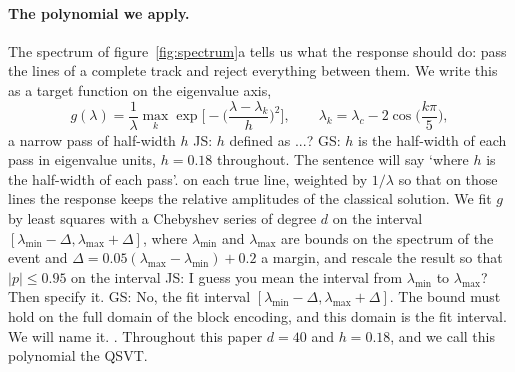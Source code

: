 \documentclass[11pt,a4paper]{article}
\newcommand{\js}[1]{{\color{blue} JS: #1 }}
\newcommand{\gs}[1]{{\color{orange!85!black} GS: #1 }}
\begin{document}
\paragraph{The polynomial we apply.}
The spectrum of figure~\ref{fig:spectrum}a tells us what the response should do: pass the lines of a
complete track and reject everything between them. We write this as a target function on the
eigenvalue axis,
\begin{equation}
g(\lambda)=\frac{1}{\lambda}\max_{k}\exp\!\Big[-\Big(\frac{\lambda-\lambda_k}{h}\Big)^2\Big],\qquad
\lambda_k=\lambda_c-2\cos\!\Big(\frac{k\pi}{5}\Big),
\end{equation}
a narrow pass of half-width $h$ \js{$h$ defined as ...?} \gs{$h$ is the half-width of each pass in eigenvalue units, $h=0.18$ throughout. The sentence will say `where $h$ is the half-width of each pass'.} on each true line, weighted by $1/\lambda$ so that on those lines
the response keeps the relative amplitudes of the classical solution. We fit $g$ by least squares
with a Chebyshev series of degree $d$ on the interval $[\lambda_{\min}-\Delta,\lambda_{\max}+\Delta]$,
where $\lambda_{\min}$ and $\lambda_{\max}$ are bounds on the spectrum of the event and
$\Delta=0.05(\lambda_{\max}-\lambda_{\min})+0.2$ a margin, and rescale the result so that
$|p|\le0.95$ on the interval \js{I guess you mean the interval from $\lambda_{\min}$ to $\lambda_{\max}$? Then specify it. } \gs{No, the fit interval $[\lambda_{\min}-\Delta,\lambda_{\max}+\Delta]$. The bound must hold on the full domain of the block encoding, and this domain is the fit interval. We will name it.}. Throughout this paper $d=40$ and $h=0.18$, and we call this
polynomial the QSVT.
\end{document}
